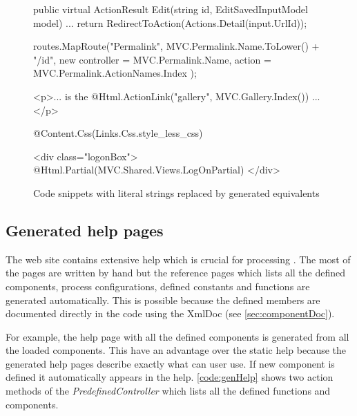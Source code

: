 \begin{figure}[h!]
	\begin{Csharp}
public virtual ActionResult Edit(string id, EditSavedInputModel model) {
	...
	return RedirectToAction(Actions.Detail(input.UrlId));
}
	\end{Csharp}
	
	\begin{Csharp}
routes.MapRoute("Permalink",
	MVC.Permalink.Name.ToLower() + "/{id}",
	new { controller = MVC.Permalink.Name, action = MVC.Permalink.ActionNames.Index }
);
	\end{Csharp}
	
	
	\begin{Razor}
<p>... is the @Html.ActionLink("gallery", MVC.Gallery.Index()) ...</p>
	\end{Razor}
	
	\begin{Razor}
@Content.Css(Links.Css.style_less_css)
	\end{Razor}
	
	\begin{Razor}
<div class="logonBox">
	@Html.Partial(MVC.Shared.Views.LogOnPartial)
</div>
	\end{Razor}
	
	\caption{Code snippets with literal strings replaced by generated equivalents}
	\label{fig:T4MVCused}
\end{figure}


\subsection{Generated help pages}

The web site contains extensive help which is crucial for processing \lsystems.
The most of the pages are written by hand but the reference pages which lists all the defined components, process configurations, defined constants and functions are generated automatically.
This is possible because the defined members are documented directly in the code using the XmlDoc (see \autoref{sec:componentDoc}).

For example, the help page with all the defined components is generated from all the loaded components.
This have an advantage over the static help because the generated help pages describe exactly what can user use.
If new component is defined it automatically appears in the help.
\autoref{code:genHelp} shows two action methods of the \emph{PredefinedController} which lists all the defined functions and components.

